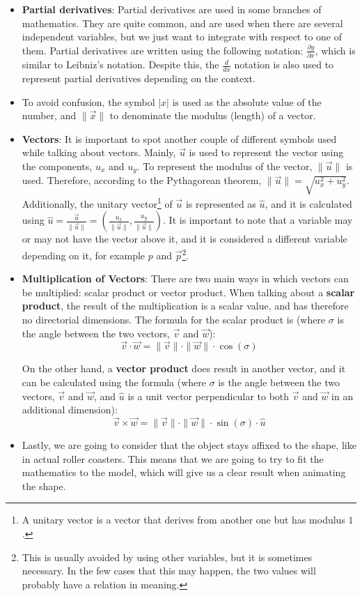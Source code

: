 \documentclass[12pt,twoside,a4paper]{article}
\newcommand{\ds}{\displaystyle}
\begin{document}
\begin{itemize}
		\item \textbf{Partial derivatives}: Partial derivatives are used in some branches of mathematics. They are quite common, and are used when there are several independent variables, but we just want to integrate with respect to one of them. Partial derivatives are written using the following notation: $\ds\frac{\partial y}{\partial x}$, which is similar to Leibniz's notation. Despite this, the $\ds\frac{d}{dx}$ notation is also used to represent partial derivatives depending on the context.
		
		\item To avoid confusion, the symbol $|x|$ is used as the absolute value of the number, and $\|\vec{x}\|$ to denominate the modulus (length) of a vector.
		
		\item \textbf{Vectors}: It is important to spot another couple of different symbols used while talking about vectors. Mainly, $\vec{u}$ is used to represent the vector using the components, $u_x$ and $u_y$. To represent the modulus of the vector, $\|\vec{u}\|$ is used. Therefore, according to the Pythagorean theorem, $\ds \|\vec{u}\| = \sqrt{u_x^2 + u_y^2}$. Additionally, the unitary vector\footnote{A unitary vector is a vector that derives from another one but has modulus $1$.} of $\vec{u}$ is represented as $\hat{u}$, and it is calculated using $\ds \hat{u} = \frac{\vec{u}}{\|\vec{u}\|} = \left(\frac{u_x}{\|\vec{u}\|}, \frac{u_y}{\|\vec{u}\|}\right)$. It is important to note that a variable may or may not have the vector above it, and it is considered a different variable depending on it, for example $p$ and $\vec{p}$\footnote{This is usually avoided by using other variables, but it is sometimes necessary. In the few cases that this may happen, the two values will probably have a relation in meaning.}.
		
		\item \textbf{Multiplication of Vectors}: There are two main ways in which vectors can be multiplied: scalar product or vector product. When talking about a \textbf{scalar product}, the result of the multiplication is a scalar value, and has therefore no directorial dimensions. The formula for the scalar product is (where $\sigma$ is the angle between the two vectors, $\vec{v}$ and $\vec{w}$):
			$$\vec{v} \cdot \vec{w} = \|\vec{v}\| \cdot \|\vec{w}\| \cdot \cos(\sigma)$$
			
		On the other hand, a \textbf{vector product} does result in another vector, and it can be calculated using the formula (where $\sigma$ is the angle between the two vectors, $\vec{v}$ and $\vec{w}$, and $\hat{u}$ is a unit vector perpendicular to both $\vec{v}$ and $\vec{w}$ in an additional dimension):
			$$\vec{v} \times \vec{w} = \|\vec{v}\| \cdot \|\vec{w}\| \cdot \sin(\sigma) \cdot \hat{u}$$
		
		
		\item Lastly, we are going to consider that the object stays affixed to the shape, like in actual roller coasters. This means that we are going to try to fit the mathematics to the model, which will give us a clear result when animating the shape.
	\end{itemize}
	
\end{document}
